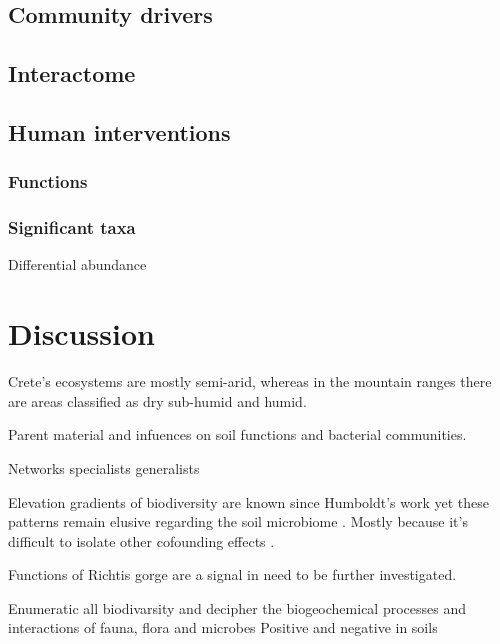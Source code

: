 \subsection{Community drivers}\label{Drivers}

\subsection{Interactome}\label{interactome}

\subsection{Human interventions}\label{Human interventions}

\subsubsection{Functions}\label{functions}

\subsubsection{Significant taxa}\label{sig_taxa}

Differential abundance

\section{Discussion}\label{discussion}

Crete's ecosystems are mostly semi-arid, whereas in the mountain ranges there 
are areas classified as dry sub-humid and humid. 

Parent material and infuences on soil functions and bacterial communities.

Networks specialists generalists \parencite{Barberan2012}

Elevation gradients of biodiversity are known since Humboldt's work \parencite{Rahbek2019} 
yet these patterns remain elusive regarding the soil microbiome \parencite{Looby2020, Siles2023}.
Mostly because it's difficult to isolate other cofounding effects \parencite{Nottingham2018}. 

Functions of Richtis gorge are a signal in need to be further investigated.

Enumeratic all biodivarsity \parencite{Anthony2023} and decipher the biogeochemical 
processes and interactions of fauna, flora and microbes \parencite{Fry2019, Crowther2019,GRANDY201640,Delgado-Baquerizo2020}
Positive and negative in soils \parencite{Liu2024}

